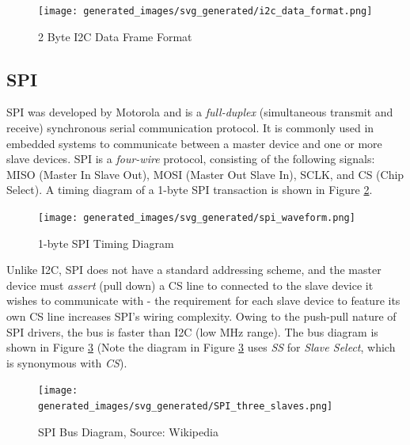 \documentclass[main.tex]{subfiles}
\begin{document}
\begin{figure}[H]
    \centering
    \texttt{[image: generated\_images/svg\_generated/i2c\_data\_format.png]}
    \caption{2 Byte I2C Data Frame Format}
    \label{fig:i2c_data_format}
\end{figure}

\subsection{SPI}
SPI was developed by Motorola \cite{SPI_history} and is a \textit{full-duplex} (simultaneous transmit and receive) synchronous serial communication protocol. It is commonly used in embedded systems to communicate between a master device and one or more slave devices. SPI is a \textit{four-wire} protocol, consisting of the following signals: MISO (Master In Slave Out), MOSI (Master Out Slave In), SCLK, and CS (Chip Select). A timing diagram of a 1-byte SPI transaction is shown in Figure \ref{fig:spi_timing}.

\begin{figure}[H]
    \centering
    \texttt{[image: generated\_images/svg\_generated/spi\_waveform.png]}
    \caption{1-byte SPI Timing Diagram}
    \label{fig:spi_timing}
\end{figure}

\noindent Unlike I2C, SPI does not have a standard addressing scheme, and the master device must \textit{assert} (pull down) a CS line to connected to the slave device it wishes to communicate with - the requirement for each slave device to feature its own CS line increases SPI's wiring complexity. Owing to the push-pull nature of SPI drivers, the bus is faster than I2C (low MHz range). The bus diagram is shown in Figure \ref{fig:spi_bus} (Note the diagram in Figure \ref{fig:spi_bus} uses \textit{SS} for \textit{Slave Select}, which is synonymous with \textit{CS}).

\begin{figure}[H]
    \centering
    \texttt{[image: generated\_images/svg\_generated/SPI\_three\_slaves.png]}
    \caption{SPI Bus Diagram, Source: Wikipedia \cite{wikipedia_SPI_bus}}
    \label{fig:spi_bus}
\end{figure}
\end{document}
